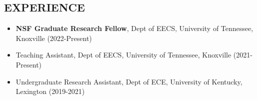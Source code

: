 \documentclass[line,margin,9pt]{res}
\begin{document}
\begin{resume}











\section{EXPERIENCE}
\begin{itemize}
\item \textbf{NSF Graduate Research Fellow}, Dept of EECS, University of Tennessee, Knoxville (2022-Present)
\item Teaching Assistant, Dept of EECS, University of Tennessee, Knoxville (2021-Present)
\item Undergraduate Research Assistant, Dept of ECE, University of Kentucky, Lexington (2019-2021)


\end{itemize}
\end{resume}
\end{document}
